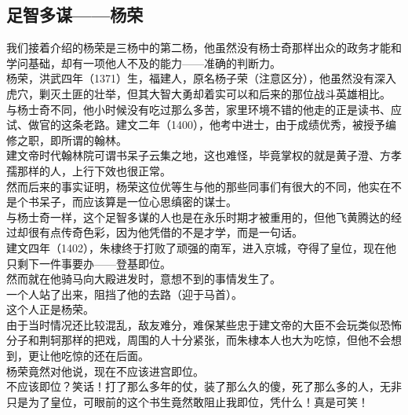 \begin{multicols}{\theparacolNo}
\subsection{足智多谋——杨荣}
我们接着介绍的杨荣是三杨中的第二杨，他虽然没有杨士奇那样出众的政务才能和学问基础，却有一项他人不及的能力——准确的判断力。\\

杨荣，洪武四年（1371）生，福建人，原名杨子荣（注意区分），他虽然没有深入虎穴，剿灭土匪的壮举，但其大智大勇却着实可以和后来的那位战斗英雄相比。\\

与杨士奇不同，他小时候没有吃过那么多苦，家里环境不错的他走的正是读书、应试、做官的这条老路。建文二年（1400），他考中进士，由于成绩优秀，被授予编修之职，即所谓的翰林。\\

建文帝时代翰林院可谓书呆子云集之地，这也难怪，毕竟掌权的就是黄子澄、方孝孺那样的人，上行下效也很正常。\\

然而后来的事实证明，杨荣这位优等生与他的那些同事们有很大的不同，他实在不是个书呆子，而应该算是一位心思缜密的谋士。\\

与杨士奇一样，这个足智多谋的人也是在永乐时期才被重用的，但他飞黄腾达的经过却很有点传奇色彩，因为他凭借的不是才学，而是一句话。\\

建文四年（1402），朱棣终于打败了顽强的南军，进入京城，夺得了皇位，现在他只剩下一件事要办——登基即位。\\

然而就在他骑马向大殿进发时，意想不到的事情发生了。\\

一个人站了出来，阻挡了他的去路（迎于马首）。\\

这个人正是杨荣。\\

由于当时情况还比较混乱，敌友难分，难保某些忠于建文帝的大臣不会玩类似恐怖分子和荆轲那样的把戏，周围的人十分紧张，而朱棣本人也大为吃惊，但他不会想到，更让他吃惊的还在后面。\\

杨荣竟然对他说，现在不应该进宫即位。\\

不应该即位？笑话！打了那么多年的仗，装了那么久的傻，死了那么多的人，无非只是为了皇位，可眼前的这个书生竟然敢阻止我即位，凭什么！真是可笑！\\


\end{multicols}
